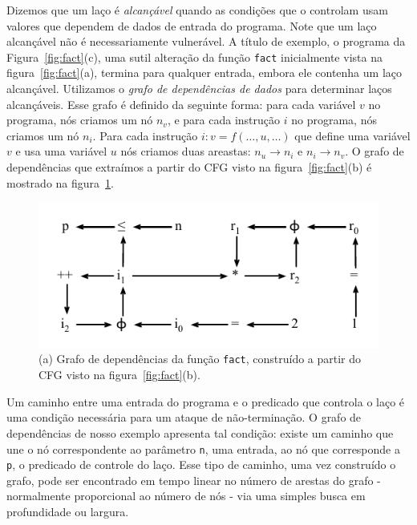 \documentclass{llncs}
\begin{document}
Dizemos que um laço é {\em alcançável} quando as condições que o controlam
usam valores que dependem de dados de entrada do programa.
Note que um laço alcançável não é necessariamente vulnerável.
A título de exemplo, o programa da Figura~\ref{fig:fact}(c), uma sutil
alteração da função \texttt{fact} inicialmente vista na
figura~\ref{fig:fact}(a), termina para qualquer entrada, embora ele contenha
um laço alcançável.
Utilizamos o {\em grafo de dependências de dados} para determinar laços
alcançáveis.
Esse grafo é definido da seguinte forma:
para cada variável $v$ no programa, nós criamos um nó $n_v$, e para cada
instrução $i$ no programa, nós criamos um nó $n_i$.
Para cada instrução $i: v = f(\ldots, u, \ldots)$ que define uma variável $v$ e
usa uma variável $u$ n\'{o}s criamos duas areastas: $n_u \rightarrow n_i$ e
$n_i \rightarrow n_v$.
O grafo de dependências que extraímos a partir do CFG visto na
figura~\ref{fig:fact}(b) é mostrado na figura~\ref{fig:depGraph}.

\begin{figure}[t!]
\begin{center}
\includegraphics{images/depGraph}
\caption{(a) Grafo de dependências da função \texttt{fact}, construído a
partir do CFG visto na figura~\ref{fig:fact}(b).}
\label{fig:depGraph}
\end{center}
\end{figure}

Um caminho entre uma entrada do programa e o predicado que controla o laço é
uma condição necessária para um ataque de não-terminação.
O grafo de dependências de nosso exemplo apresenta tal condição:
existe um caminho que une o nó correspondente ao parâmetro \texttt{n}, uma
entrada, ao nó que corresponde a \texttt{p}, o predicado de controle do
laço.
Esse tipo de caminho, uma vez construído o grafo, pode ser encontrado em
tempo linear no número de arestas do grafo - normalmente proporcional ao
número de nós - via uma simples busca em profundidade ou largura.
\end{document}
